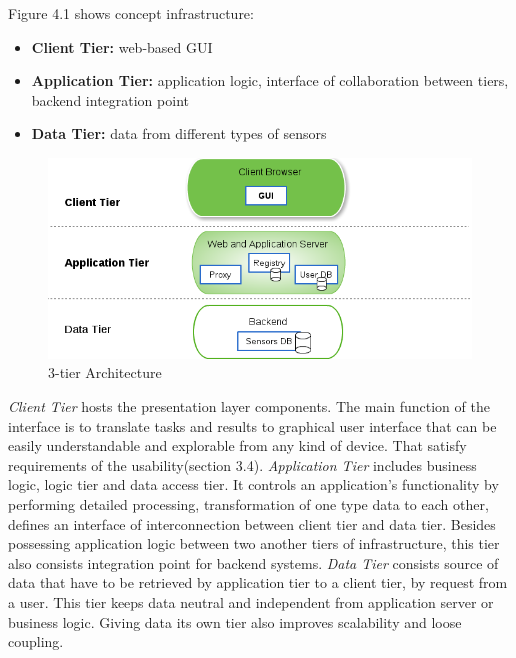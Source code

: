   Figure 4.1 shows concept infrastructure:
  \begin{itemize}
  \item \textbf{Client Tier:} web-based GUI
  \item \textbf{Application Tier:} application logic, interface of collaboration between tiers, backend integration point
  \item \textbf{Data Tier:} data from different types of sensors
  \end{itemize} 
  \begin{figure}[!ht]
  \centering
  \includegraphics[scale=0.7]{images/3tier.png}   
  \caption[3-tier Architecture]{3-tier Architecture}
  \label{img:3-tier Architecture}                           
  \end{figure}

  \emph{Client Tier} hosts the presentation layer components. The main function of the interface is to translate tasks and results to graphical user interface that can be easily understandable and explorable from any kind of device. That satisfy requirements of the usability(section 3.4).
  \newline
  \emph{Application Tier} includes business logic, logic tier and data access tier. It controls an application's functionality by performing detailed processing, transformation of one type data to each other, defines an interface of interconnection between client tier and data tier. Besides possessing application logic between two another tiers of infrastructure, this tier also consists integration point for backend systems.
  \newline
  \emph{Data Tier} consists source of data that have to be retrieved by application tier to a client tier, by request from a user. This tier keeps data neutral and independent from application server or business logic. Giving data its own tier also improves scalability and loose coupling. 
  
